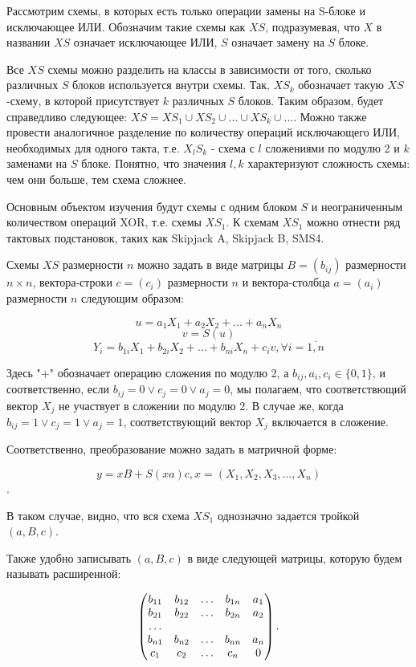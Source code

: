 \documentclass[a4paper,12pt]{extarticle}
\theoremstyle{plain} %
\begin{document}
\begin{large}
Рассмотрим схемы, в которых есть только операции замены на S-блоке и исключающее ИЛИ. Обозначим такие схемы как $XS$, подразумевая, что $X$ в названии $XS$ означает исключающее ИЛИ, $S$ означает замену на $S$ блоке. 

Все $XS$ схемы можно разделить на классы в зависимости от того, сколько различных $S$ блоков используется внутри схемы. Так, $XS_k$ обозначает такую $XS$-схему, в которой присутствует $k$ различных $S$ блоков. Таким образом, будет справедливо следующее: $XS = XS_1 \cup XS_2 \cup ... \cup XS_k \cup...$. Можно также провести аналогичное разделение по количеству операций исключающего ИЛИ, необходимых для одного такта, т.е. $X_lS_k$ - схема с $l$ сложениями по модулю 2 и $k$ заменами на $S$ блоке. Понятно, что значения $l, k$ характеризуют сложность схемы: чем они больше, тем схема сложнее.

Основным объектом изучения будут схемы с одним блоком $S$ и неограниченным количеством операций XOR, т.е. схемы $XS_1$. К схемам $XS_1$ можно отнести ряд тактовых подстановок, таких как Skipjack A, Skipjack B, SMS4. 

Схемы $XS$ размерности $n$ можно задать в виде матрицы $B = (b_{ij})$ размерности $n \times n$, вектора-строки $c = (c_i)$ размерности $n$ и вектора-столбца $a=(a_i)$ размерности $n$ следующим образом:

$$u = a_1X_1 + a_2X_2 + ... + a_nX_n$$
$$v = S(u)$$
$$Y_i = b_{1i}X_1 + b_{2i}X_2 + ... + b_{ni}X_n + c_iv, \forall i = \overline{1,n}$$

Здесь "+" обозначает операцию сложения по модулю 2, а $b_{ij}, a_i, c_i \in \{0, 1\}$, и соответственно, если $b_{ij} = 0 \vee c_j=0 \vee a_j = 0$, мы полагаем, что соответствющий вектор $X_j$ не участвует в сложении по модулю 2. В случае же, когда $b_{ij} = 1 \vee c_j=1 \vee a_j = 1$, соответствующий вектор $X_j$ включается в сложение.

Соответственно, преобразование можно задать в матричной форме:

$$y = xB + S(xa)c, x = (X_1, X_2, X_3, ..., X_n)$$.

В таком случае, видно, что вся схема $XS_1$ однозначно задается тройкой $(a, B, c)$. 

Также удобно записывать $(a, B, c)$ в виде следующей матрицы, которую будем называть расширенной:

$$
\begin{pmatrix}
b_{11} & b_{12} & \ldots & b_{1n} & a_1\\
b_{21} & b_{22} & \ldots & b_{2n} & a_2\\
\dotfill\\
b_{n1} & b_{n2} & \ldots & b_{nn} & a_n\\
c_1    & c_2    & \ldots & c_n    & 0\\
\end{pmatrix}.
$$


\end{large}
\end{document}
